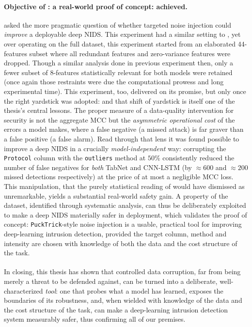 \documentclass[../main.tex]{subfiles}
\begin{document}
\paragraph{Objective of : a real-world proof of concept: achieved. \newline}
 asked the more pragmatic question of whether targeted noise injection could \emph{improve} a deployable deep NIDS. This experiment had a similar setting to , yet over operating on the full dataset, this experiment started from an elaborated 44-features subset where all redundant features and zero-variance features were dropped. Though a similar analysis done in previous experiment then, only a fewer subset of 8-features statistically relevant for both models were retained (once again those restraints were due the computational prowess and long experimental time).
This experiment, too, delivered on its promise, but only once the right yardstick was adopted: and that shift of yardstick is itself one of the thesis's central lessons. The proper measure of a data-quality intervention for security is not the aggregate MCC but the \emph{asymmetric operational cost} of the errors a model makes, where a false negative (a missed attack) is far graver than a false positive (a false alarm). Read through that lens it was found possible to improve a deep NIDS in a crucially \emph{model-independent} way: corrupting the \texttt{Protocol} column with the \texttt{outliers} method at $50\%$ consistently reduced the number of false negatives for \emph{both} TabNet and CNN-LSTM (by $\approx 600$ and $\approx 200$ missed detections respectively) at the price of at most a negligible MCC loss. This manipulation, that the purely statistical reading of  would have dismissed as unremarkable, yields a substantial real-world safety gain. A property of the dataset, identified through systematic analysis, can thus be deliberately exploited to make a deep NIDS materially safer in deployment, which validates the proof of concept: \texttt{PuckTrick}-style noise injection is a usable, practical tool for improving deep-learning intrusion detection, provided the target column, method and intensity are chosen with knowledge of both the data and the cost structure of the task.




\paragraph{}
In closing, this thesis has shown that controlled data corruption, far from being merely a threat to be defended against, can be turned into a deliberate, well-characterized \emph{tool}: one that probes what a model has learned, exposes the boundaries of its robustness, and, when wielded with knowledge of the data and the cost structure of the task, can make a deep-learning intrusion detection system measurably safer, thus confirming all of our premises.
\end{document}

